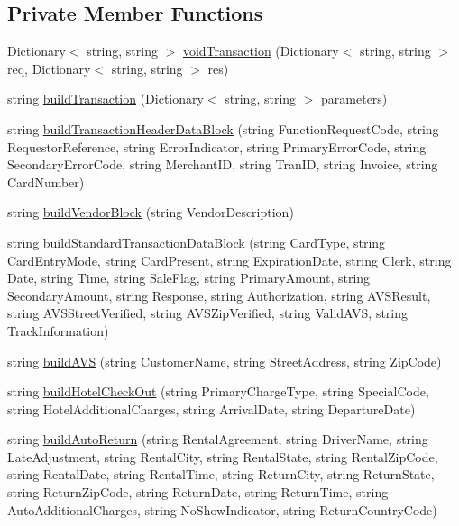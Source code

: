 \subsection*{Private Member Functions}
\begin{DoxyCompactItemize}
\item 
Dictionary$<$ string, string $>$ \mbox{\hyperlink{class_form_sim_1_1_t_c_p_handler_a3c510f254bcd72de16d7824b89202878}{void\+Transaction}} (Dictionary$<$ string, string $>$ req, Dictionary$<$ string, string $>$ res)
\item 
string \mbox{\hyperlink{class_form_sim_1_1_t_c_p_handler_a5de578eeab047053441c0f5065e7258d}{build\+Transaction}} (Dictionary$<$ string, string $>$ parameters)
\item 
string \mbox{\hyperlink{class_form_sim_1_1_t_c_p_handler_a559496e83281e6dbfbc2010545465495}{build\+Transaction\+Header\+Data\+Block}} (string Function\+Request\+Code, string Requestor\+Reference, string Error\+Indicator, string Primary\+Error\+Code, string Secondary\+Error\+Code, string Merchant\+ID, string Tran\+ID, string Invoice, string Card\+Number)
\item 
string \mbox{\hyperlink{class_form_sim_1_1_t_c_p_handler_a87f8f6969a00e3c1f1f9510c3317c722}{build\+Vendor\+Block}} (string Vendor\+Description)
\item 
string \mbox{\hyperlink{class_form_sim_1_1_t_c_p_handler_a2790fa048c3f474f8690c7097310dd87}{build\+Standard\+Transaction\+Data\+Block}} (string Card\+Type, string Card\+Entry\+Mode, string Card\+Present, string Expiration\+Date, string Clerk, string Date, string Time, string Sale\+Flag, string Primary\+Amount, string Secondary\+Amount, string Response, string Authorization, string A\+V\+S\+Result, string A\+V\+S\+Street\+Verified, string A\+V\+S\+Zip\+Verified, string Valid\+A\+VS, string Track\+Information)
\item 
string \mbox{\hyperlink{class_form_sim_1_1_t_c_p_handler_a3fae46a36f1dfbc342a2af60be9805a7}{build\+A\+VS}} (string Customer\+Name, string Street\+Address, string Zip\+Code)
\item 
string \mbox{\hyperlink{class_form_sim_1_1_t_c_p_handler_afc287867c962d1863c17c82ce12d7907}{build\+Hotel\+Check\+Out}} (string Primary\+Charge\+Type, string Special\+Code, string Hotel\+Additional\+Charges, string Arrival\+Date, string Departure\+Date)
\item 
string \mbox{\hyperlink{class_form_sim_1_1_t_c_p_handler_a9f96d9f729c2dd000b31f7cafb5d19f8}{build\+Auto\+Return}} (string Rental\+Agreement, string Driver\+Name, string Late\+Adjustment, string Rental\+City, string Rental\+State, string Rental\+Zip\+Code, string Rental\+Date, string Rental\+Time, string Return\+City, string Return\+State, string Return\+Zip\+Code, string Return\+Date, string Return\+Time, string Auto\+Additional\+Charges, string No\+Show\+Indicator, string Return\+Country\+Code)

\end{DoxyCompactItemize}
